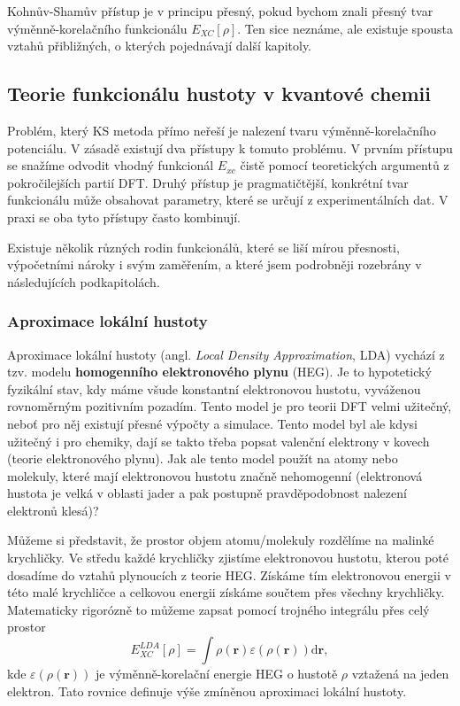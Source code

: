 Kohnův-Shamův přístup je v principu přesný, pokud bychom znali přesný tvar výměnně-korelačního funkcionálu $E_{XC}[\rho]$.
Ten sice neznáme, ale existuje spousta vztahů přibližných, o kterých pojednávají další kapitoly.

\subsection{Teorie funkcionálu hustoty v kvantové chemii}

Problém, který KS metoda přímo neřeší je nalezení tvaru výměnně-korelačního potenciálu.
V zásadě existují dva přístupy k tomuto problému. V prvním přístupu se snažíme odvodit vhodný funkcionál $E_{xc}$ čistě pomocí teoretických argumentů z pokročilejších partií DFT. Druhý přístup je pragmatičtější, konkrétní tvar funkcionálu může obsahovat parametry, které se určují z experimentálních dat. V praxi se oba tyto přístupy často kombinují.

Existuje několik různých rodin funkcionálů, které se liší mírou přesnosti, výpočetními nároky i svým zaměřením, a které jsem podrobněji rozebrány v následujících podkapitolách.

\subsubsection{Aproximace lokální hustoty}

Aproximace lokální hustoty (angl. \textit{Local Density Approximation}, LDA) vychází z tzv. modelu \textbf{homogenního elektronového plynu} (HEG). Je to hypotetický fyzikální stav, kdy máme všude konstantní elektronovou hustotu, vyváženou rovnoměrným pozitivním pozadím. Tento model je pro teorii DFT velmi užitečný, neboť pro něj existují přesné výpočty a simulace. Tento model byl ale kdysi užitečný i pro chemiky, dají se takto třeba popsat valenční elektrony v kovech (teorie elektronového plynu). Jak ale tento model použít na atomy nebo molekuly, které mají elektronovou hustotu značně nehomogenní (elektronová hustota je velká v oblasti jader a pak postupně pravděpodobnost nalezení elektronů klesá)?

Můžeme si představit, že prostor objem atomu/molekuly rozdělíme na malinké krychličky. Ve středu každé krychličky zjistíme elektronovou hustotu, kterou poté dosadíme do vztahů plynoucích z teorie HEG.
Získáme tím elektronovou energii v této malé krychličce a celkovou energii získáme součtem přes všechny krychličky. Matematicky rigorózně to můžeme zapsat pomocí trojného integrálu přes celý prostor
\begin{equation}
E_{XC}^{LDA}[\rho]=\int \rho(\textbf{r}) \varepsilon(\rho(\textbf{r})) \mathrm{d}\textbf{r} ,
\end{equation}
kde $\varepsilon(\rho(\textbf{r}))$ je výměnně-korelační energie HEG o hustotě $\rho$ vztažená na jeden elektron. Tato rovnice definuje výše zmíněnou aproximaci lokální hustoty.

